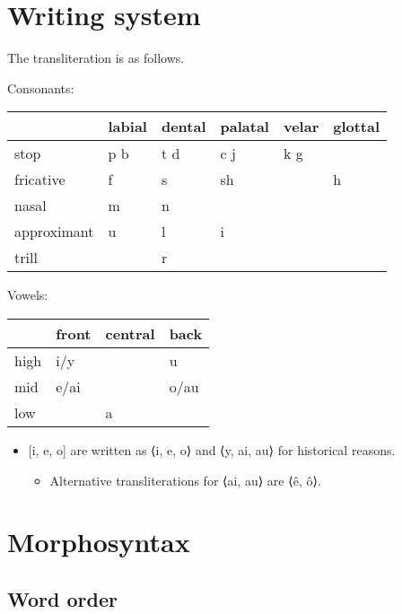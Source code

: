 \documentclass[
  a4paper,
]{article}
\providecommand{\tightlist}{%
  \setlength{\itemsep}{0pt}\setlength{\parskip}{0pt}}
\begin{document}
\hypertarget{writing-system}{%
\section{Writing system}\label{writing-system}}

The transliteration is as follows.

Consonants:

\begin{longtable}[]{@{}llllll@{}}
\toprule
& labial & dental & palatal & velar & glottal \\
\midrule
\endhead
stop & p b & t d & c j & k g & \\
fricative & f & s & sh & & h \\
nasal & m & n & & & \\
approximant & u & l & i & & \\
trill & & r & & & \\
\bottomrule
\end{longtable}

Vowels:

\begin{longtable}[]{@{}llll@{}}
\toprule
& front & central & back \\
\midrule
\endhead
high & i/y & & u \\
mid & e/ai & & o/au \\
low & & a & \\
\bottomrule
\end{longtable}

\begin{itemize}
\tightlist
\item
  {[}i, e, o{]} are written as ⟨i, e, o⟩ and ⟨y, ai, au⟩ for historical
  reasons.

  \begin{itemize}
  \tightlist
  \item
    Alternative transliterations for ⟨ai, au⟩ are ⟨ê, ô⟩.
  \end{itemize}
\end{itemize}

\hypertarget{morphosyntax}{%
\section{Morphosyntax}\label{morphosyntax}}

\hypertarget{word-order}{%
\subsection{Word order}\label{word-order}}
\end{document}
